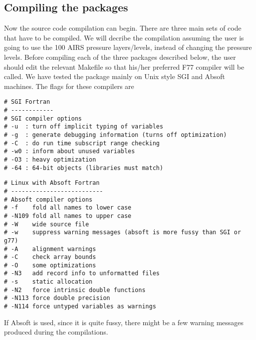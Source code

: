 \documentclass[12pt]{article}
\begin{document}
\subsection{Compiling the packages}
Now the source code compilation can begin. There are three main sets of code
that have to be compiled. We will decribe the compilation assuming the user 
is going to use the 100 AIRS pressure layers/levels, instead of changing the 
pressure levels. Before compiling each of the three packages described below, 
the user should edit the relevant Makefile so that his/her preferred F77 
compiler will be called. We have tested the package mainly on Unix style 
SGI and Absoft machines. The flags for these compilers are
\begin{verbatim}
# SGI Fortran
# ------------
# SGI compiler options
# -u  : turn off implicit typing of variables
# -g  : generate debugging information (turns off optimization)
# -C  : do run time subscript range checking
# -w0 : inform about unused variables
# -O3 : heavy optimization
# -64 : 64-bit objects (libraries must match)
\end{verbatim}
\begin{verbatim}
# Linux with Absoft Fortran
# --------------------------
# Absoft compiler options
# -f    fold all names to lower case
# -N109 fold all names to upper case
# -W    wide source file
# -w    suppress warning messages (absoft is more fussy than SGI or g77)
# -A    alignment warnings
# -C    check array bounds
# -O    some optimizations
# -N3   add record info to unformatted files
# -s    static allocation
# -N2   force intrinsic double functions
# -N113 force double precision
# -N114 force untyped variables as warnings
\end{verbatim}

If Absoft is used, since it is quite fussy, there might be a few warning 
messages produced during the compilations.
\end{document}
